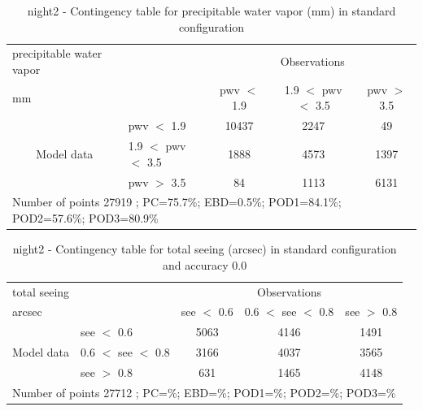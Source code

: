 \begin{table}[p!]
\begin{center}
\begin{tabular}{llccc}
\hline
{precipitable water vapor}                                       &                                                    & \multicolumn{3}{c}{Observations}                 \\
{mm}                                       &                             & pwv $<$ 1.9   & 1.9 $<$ pwv $<$ 3.5 & pwv $>$ 3.5 \\
\hline
\multicolumn{1}{c}{\multirow{3}{*}{Model data}}  & pwv $<$ 1.9             & 10437                & 2247                       & 49              \\
                                                 & 1.9  $<$ pwv $<$ 3.5 & 1888                & 4573                       & 1397              \\
                                                 & pwv $>$ 3.5             & 84                & 1113                       & 6131              \\
\hline
\multicolumn{5}{l}{ Number of points        27919 ; PC=75.7\%; EBD=0.5\%; POD1=84.1\%; POD2=57.6\%; POD3=80.9\%}                 \\
\end{tabular}
\end{center}
\caption{night2 - Contingency table for  precipitable water vapor (mm) in standard configuration  }
\label{tab:contingencypwvBEF:night2}
\end{table}
\clearpage
\begin{table}[p!]
\begin{center}
\begin{tabular}{llccc}
\hline
{total seeing}                                       &                                                    & \multicolumn{3}{c}{Observations}                 \\
{arcsec}                                       &                             & see $<$ 0.6   & 0.6 $<$ see $<$ 0.8 & see $>$ 0.8 \\
\hline
\multicolumn{1}{c}{\multirow{3}{*}{Model data}}  & see $<$ 0.6             & 5063                & 4146                       & 1491              \\
                                                 & 0.6  $<$ see $<$ 0.8 & 3166                & 4037                       & 3565              \\
                                                 & see $>$ 0.8             & 631                & 1465                       & 4148              \\
\hline
\multicolumn{5}{l}{ Number of points        27712 ; PC=\%; EBD=\%; POD1=\%; POD2=\%; POD3=\%}
\end{tabular}
\end{center}
\caption{night2 - Contingency table for  total seeing (arcsec) in standard configuration and accuracy 0.0}
\label{tab:contingencyseeBEF:night2}
\end{table}
